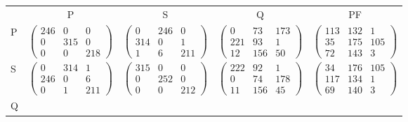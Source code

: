 \begin{tabular}{p{0.5cm}cccc}
 & P & S & Q & PF\\ 
P & 
 $\begin{pmatrix}
     246  &       0  &       0 \\
       0  &     315  &       0 \\
       0  &       0  &     218 
\end{pmatrix}$
 & 
 $\begin{pmatrix}
       0  &     246  &       0 \\
     314  &       0  &       1 \\
       1  &       6  &     211 
\end{pmatrix}$
 & 
 $\begin{pmatrix}
       0  &      73  &     173 \\
     221  &      93  &       1 \\
      12  &     156  &      50 
\end{pmatrix}$
 & 
 $\begin{pmatrix}
     113  &     132  &       1 \\
      35  &     175  &     105 \\
      72  &     143  &       3 
\end{pmatrix}$
\\ 
S & 
 $\begin{pmatrix}
       0  &     314  &       1 \\
     246  &       0  &       6 \\
       0  &       1  &     211 
\end{pmatrix}$
 & 
 $\begin{pmatrix}
     315  &       0  &       0 \\
       0  &     252  &       0 \\
       0  &       0  &     212 
\end{pmatrix}$
 & 
 $\begin{pmatrix}
     222  &      92  &       1 \\
       0  &      74  &     178 \\
      11  &     156  &      45 
\end{pmatrix}$
 & 
 $\begin{pmatrix}
      34  &     176  &     105 \\
     117  &     134  &       1 \\
      69  &     140  &       3 
\end{pmatrix}$
\\ 
Q & 

\end{tabular}
